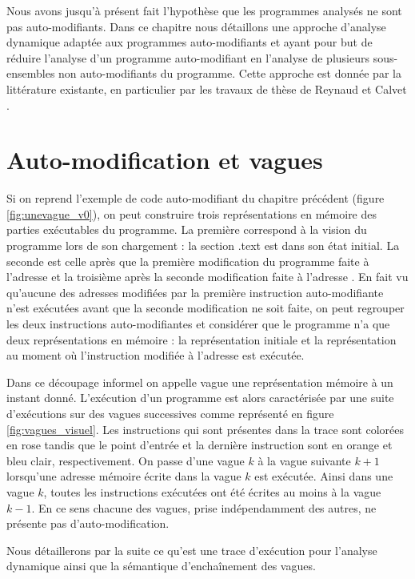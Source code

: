 
Nous avons jusqu'à présent fait l'hypothèse  que les programmes analysés ne sont pas auto-modifiants.
Dans ce chapitre nous détaillons une approche d'analyse dynamique adaptée aux programmes auto-modifiants et ayant pour but de réduire l'analyse d'un programme auto-modifiant en l'analyse de plusieurs sous-ensembles non auto-modifiants du programme.
Cette approche est donnée par la littérature existante, en particulier par les travaux de thèse de Reynaud \cite{Reynaud2010} et Calvet \cite{Calvet2013}.

\section{Auto-modification et vagues}
Si on reprend l'exemple de code auto-modifiant du chapitre précédent (figure \ref{fig:unevague_v0}), on peut construire trois représentations en mémoire des parties exécutables du programme.
La première correspond à la vision du programme lors de son chargement : la section .text est dans son état initial.
La seconde est celle après que la première modification du programme faite à l'adresse  et la troisième après la seconde modification faite à l'adresse .
En fait vu qu'aucune des adresses modifiées par la première instruction auto-modifiante n'est exécutées avant que la seconde modification ne soit faite, on peut regrouper les deux instructions auto-modifiantes et considérer que le programme n'a que deux représentations en mémoire : la représentation initiale et la représentation au moment où l'instruction modifiée à l'adresse  est exécutée.

Dans ce découpage informel on appelle vague une représentation mémoire à un instant donné. 
L'exécution d'un programme est alors caractérisée par une suite d'exécutions sur des vagues successives comme représenté en figure \ref{fig:vagues_visuel}. Les instructions qui sont présentes dans la trace sont colorées en rose tandis que le point d'entrée et la dernière instruction sont en orange et bleu clair, respectivement.
On passe d'une vague $k$ à la vague suivante $k+1$ lorsqu'une adresse mémoire écrite dans la vague $k$ est exécutée.
Ainsi dans une vague $k$, toutes les instructions exécutées ont été écrites au moins à la vague $k-1$. 
En ce sens chacune des vagues, prise indépendamment des autres, ne présente pas d'auto-modification.

Nous détaillerons par la suite ce qu'est une trace d'exécution pour l'analyse dynamique ainsi que la sémantique d'enchaînement des vagues.

